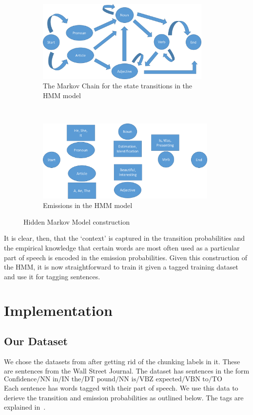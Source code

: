 \documentclass[11pt]{article}
\begin{document}
\begin{figure}[!t]
\begin{subfigure}[t]{0.5\textwidth}
	\centering
	\includegraphics[height=1.6in]{hmm-trans}
	\caption{The Markov Chain for the state transitions in the HMM model}
	\label{fig:hmm-trans}
\end{subfigure}~
\begin{subfigure}[t]{0.5\textwidth}
	\centering
	\includegraphics[height=1.6in]{hmm-emis}
	\caption{Emissions in the HMM model}
	\label{fig:hmm-emis}
\end{subfigure}
\caption{Hidden Markov Model construction}
\label{fig:hmm}
\end{figure}

It is clear, then, that the `context' is captured in the transition probabilities and the empirical knowledge that certain words are most often used as a particular part of speech is encoded in the emission probabilities. Given this construction of the HMM, it is now straightforward to train it given a tagged training dataset and use it for tagging sentences. 

\section{Implementation}

\subsection{Our Dataset}
We chose the datasets from \cite{dataset} after getting rid of the chunking labels in it. These are sentences from the Wall Street Journal. The dataset has sentences in the form
%
$$\text{Confidence/NN in/IN the/DT pound/NN is/VBZ expected/VBN to/TO take/VB a/DT sharp/JJ dive/NN}$$
%
Each sentence has words tagged with their part of speech. We use this data to derieve the transition and emission probabilities as outlined below. The tags are explained in~\cite{tags}.
\end{document}
